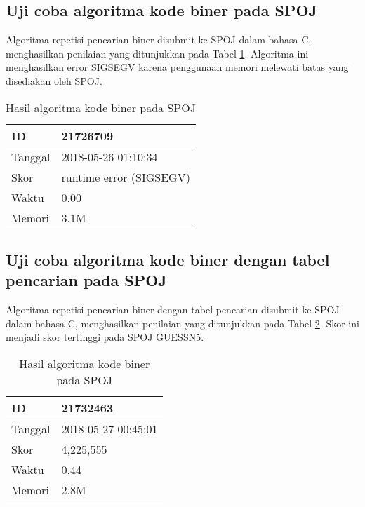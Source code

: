 \subsection{Uji coba algoritma kode biner pada SPOJ}

Algoritma repetisi pencarian biner disubmit ke SPOJ dalam bahasa C, menghasilkan penilaian yang ditunjukkan pada Tabel \ref{tab:score_brute_binary_code}. Algoritma ini menghasilkan error SIGSEGV karena penggunaan memori melewati batas yang disediakan oleh SPOJ.

\begin{table}[h!]
\caption{Hasil algoritma kode biner pada SPOJ}
\label{tab:score_brute_binary_code}
\begin{center}
\begin{tabular} {|l|l|}
\hline
ID & 21726709 \\ \hline
Tanggal & 2018-05-26 01:10:34 \\ \hline
Skor & runtime error (SIGSEGV) \\ \hline
Waktu & 0.00 \\ \hline
Memori & 3.1M \\ \hline
\end{tabular}
\end{center}
\end{table}

\subsection{Uji coba algoritma kode biner dengan tabel pencarian pada SPOJ}

Algoritma repetisi pencarian biner dengan tabel pencarian disubmit ke SPOJ dalam bahasa C, menghasilkan penilaian yang ditunjukkan pada Tabel \ref{tab:score_binary_code}. Skor ini menjadi skor tertinggi pada SPOJ GUESSN5.

\begin{table}[h!]
\caption{Hasil algoritma kode biner pada SPOJ}
\label{tab:score_binary_code}
\begin{center}
\begin{tabular} {|l|l|}
\hline
ID & 21732463 \\ \hline
Tanggal & 2018-05-27 00:45:01 \\ \hline
Skor & 4,225,555 \\ \hline
Waktu & 0.44 \\ \hline
Memori & 2.8M \\ \hline
\end{tabular}
\end{center}
\end{table}
